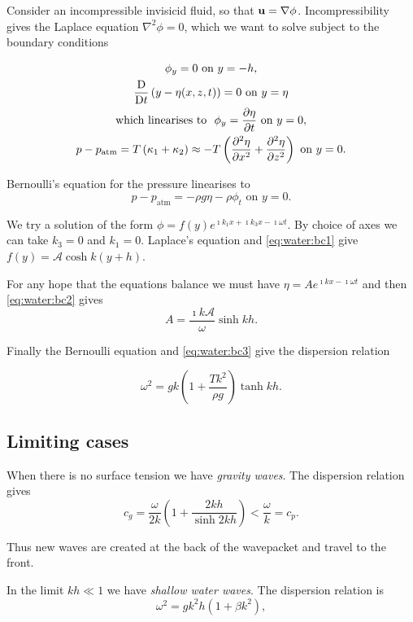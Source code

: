 \documentclass{notes}
\newcommand{\cA}{\mathcal{A}}
\begin{document}
\vspace{1.5in}

Consider an incompressible invisicid fluid, so that $\mathbf{u} = \nabla \phi$.
Incompressibility gives the Laplace equation $\nabla^2 \phi = 0$,
which we want to solve subject to the boundary conditions

\begin{gather}
\phi_y = 0 \text{ on } y = -h,\label{eq:water:bc1} \\
\frac{\mathrm{D}}{\mathrm{D} t} \left( y - \eta(x,z,t) \right) = 0 \text{ on } y = \eta \\
\text{which linearises to }\
\phi_y = \frac{\partial \eta}{\partial t} \text{ on } y = 0,\label{eq:water:bc2} \\
p - p_{\text{atm}} = T \left(\kappa_1 + \kappa_2\right)
\approx - T \left( \frac{\partial ^2 \eta}{\partial x^2} + \frac{\partial ^2 \eta}{\partial z^2} \right) \text{ on }
y = 0 \label{eq:water:bc3}.
\end{gather}

Bernoulli's equation for the pressure linearises to
\[
p - p_{\text{atm}} = - \rho g \eta - \rho \phi_t \text{ on } y = 0.
\]

We try a solution of the form
$\phi = f(y) e^{\imath k_1 x + \imath k_3 x - \imath \omega t}$.
By choice of axes we can take $k_3 = 0$ and $k_1 = 0$.  Laplace's equation
and \eqref{eq:water:bc1} give
$f(y) = \cA \cosh k(y+h)$.

For any hope that the equations balance we must have
$\eta = A e^{\imath k x - \imath \omega t}$ and then \eqref{eq:water:bc2}
gives
\[
A = \frac{\imath k \cA}{\omega} \sinh k h.
\]

Finally the Bernoulli equation and \eqref{eq:water:bc3} give the
dispersion relation

\begin{equation}\label{eq:water:disp}
\omega^2 = g k \left( 1 + \frac{T k^2}{\rho g} \right) \tanh k h.
\end{equation}

\subsection{Limiting cases}

When there is no surface tension we have \emph{gravity waves}.
The dispersion relation gives
\[
c_g = \frac{\omega}{2 k} \left( 1+ \frac{2 k h}{\sinh 2 k h}\right)
< \frac{\omega}{k} = c_p.
\]

Thus new waves are created at the back of the wavepacket and travel to
the front.

In the limit $kh \ll 1$ we have \emph{shallow water waves}.  The
dispersion relation is
\[
\omega^2 = g k^2 h \left(1 + \beta k^2\right),
\]
\end{document}
